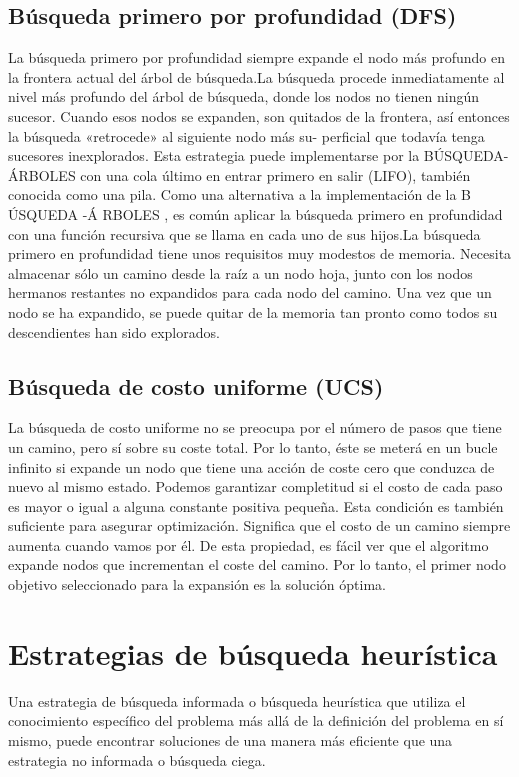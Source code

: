 \documentclass[12pt,a4paper]{report}
\begin{document}
\subsection*{Búsqueda primero por profundidad (DFS)}
La búsqueda primero por profundidad siempre expande el nodo más profundo en la frontera actual del árbol de búsqueda.La búsqueda procede inmediatamente al nivel más profundo del árbol de búsqueda, donde los nodos no tienen ningún sucesor. Cuando esos nodos se expanden, son quitados de la frontera, así entonces la búsqueda «retrocede» al siguiente nodo más su-
perficial que todavía tenga sucesores inexplorados. Esta estrategia puede implementarse por la BÚSQUEDA-ÁRBOLES con una cola último en entrar primero en salir (LIFO), también conocida como una pila. Como una alternativa a la implementación de la B ÚSQUEDA -Á RBOLES , es común aplicar la búsqueda primero en profundidad con una función recursiva que se llama en cada uno de sus hijos.La búsqueda primero en profundidad tiene unos requisitos muy modestos de memoria. Necesita almacenar sólo un camino desde la raíz a un nodo hoja, junto con los nodos hermanos restantes no expandidos para cada nodo del camino. Una vez que un nodo se ha expandido, se puede quitar de la memoria tan pronto como todos su descendientes han sido explorados.
\subsection*{Búsqueda de costo uniforme (UCS)}
La búsqueda de costo uniforme no se preocupa por el número de pasos que tiene un camino, pero sí sobre su coste total. Por lo tanto, éste se meterá en un bucle infinito si expande un nodo que tiene una acción de coste cero que conduzca de nuevo al mismo estado. Podemos garantizar completitud si el costo de cada paso es mayor o igual a alguna constante positiva pequeña. Esta condición es también suficiente para asegurar optimización. Significa que el costo de un camino siempre aumenta cuando vamos por él. De esta propiedad, es fácil ver que el algoritmo expande nodos que incrementan el coste del camino. Por lo tanto, el primer nodo objetivo seleccionado para la expansión es la solución óptima.
\section{Estrategias de búsqueda heurística}
Una estrategia de búsqueda informada o búsqueda heurística que utiliza el conocimiento específico del problema más allá de la definición del problema en sí mismo, puede encontrar soluciones de una manera más eficiente que una estrategia no informada o búsqueda ciega.
\end{document}
